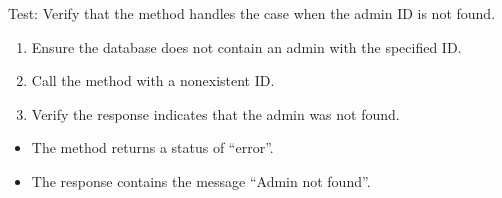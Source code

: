 \documentclass[letterpaper,10pt,english]{sphinxmanual}
\begin{document}
\begin{fulllineitems}
\label{\detokenize{test:test.test_admin.test_delete_admin_not_found}}
\pysigstartsignatures
\pysiglinewithargsret
{}
{}
{}
\pysigstopsignatures
\sphinxAtStartPar
Test: Verify that the method handles the case when the admin ID is not found.
\begin{description}
\begin{enumerate}
%
\item {} 
\sphinxAtStartPar
Ensure the database does not contain an admin with the specified ID.

\item {} 
\sphinxAtStartPar
Call the  method with a non\sphinxhyphen{}existent ID.

\item {} 
\sphinxAtStartPar
Verify the response indicates that the admin was not found.

\end{enumerate}

\begin{itemize}
\item {} 
\sphinxAtStartPar
The method returns a status of “error”.

\item {} 
\sphinxAtStartPar
The response contains the message “Admin not found”.

\end{itemize}

\end{description}

\end{fulllineitems}

\end{document}
